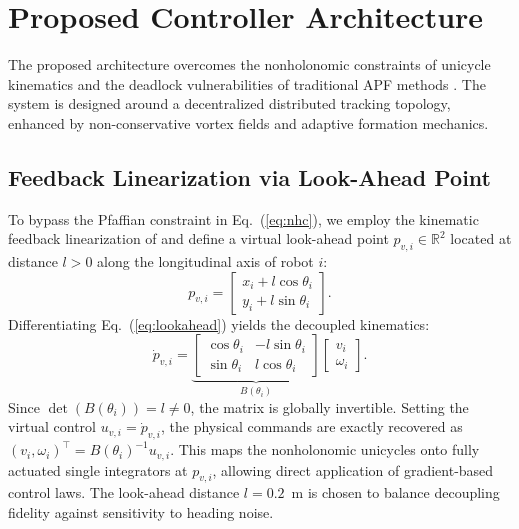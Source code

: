 \documentclass[letterpaper, 10 pt, journal, twoside]{IEEEtran}
\newcommand{\R}{\mathbb{R}}
\newcommand{\eqnref}[1]{Eq.~(\ref{#1})}
\def\matt#1{\begin{bmatrix}#1\end{bmatrix}}
\begin{document}
\section{Proposed Controller Architecture}

The proposed architecture overcomes the nonholonomic constraints of
unicycle kinematics and the deadlock vulnerabilities of traditional APF
methods \cite{kan2012ITAC}.  The system is designed around a decentralized
distributed tracking topology, enhanced by non-conservative vortex fields
and adaptive formation mechanics.


\subsection{Feedback Linearization via Look-Ahead Point}
To bypass the Pfaffian constraint in \eqnref{eq:nhc}, we employ the
kinematic feedback linearization of \cite{oriolo2002TCST} and define a
virtual look-ahead point $p_{v,i}\in\R^{2}$ located at distance $l>0$
along the longitudinal axis of robot $i$:
\begin{equation}
  p_{v,i}=\matt{x_{i}+l\cos\theta_{i}\\y_{i}+l\sin\theta_{i}}.
  \label{eq:lookahead}
\end{equation}
Differentiating \eqnref{eq:lookahead} yields the decoupled kinematics:
\begin{equation}
  \dot{p}_{v,i}=
  \underbrace{\matt{\cos\theta_{i}&-l\sin\theta_{i}\\
                    \sin\theta_{i}& l\cos\theta_{i}}}_{B(\theta_{i})}
  \matt{v_{i}\\\omega_{i}}.
  \label{eq:Bmat}
\end{equation}
Since $\det(B(\theta_{i}))=l\neq 0$, the matrix is globally invertible.
Setting the virtual control $u_{v,i}=\dot{p}_{v,i}$, the physical commands
are exactly recovered as $(v_{i},\omega_{i})^{\top}=B(\theta_{i})^{-1}u_{v,i}$.
This maps the nonholonomic unicycles onto fully actuated single integrators
at $p_{v,i}$, allowing direct application of gradient-based control laws.
The look-ahead distance $l=0.2$~m is chosen to balance decoupling fidelity
against sensitivity to heading noise.
\end{document}
